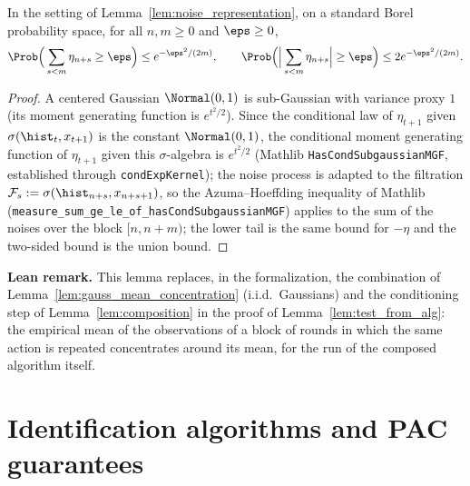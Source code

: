 \begin{lemma}\label{lem:noise_azuma}
\leanok
{}
In the setting of Lemma~\ref{lem:noise_representation}, on a standard Borel probability space,
for all $n, m \ge 0$ and $\eps \ge 0$,
\[
  \Prob\Big(\sum_{s<m}\eta_{n+s} \ge \eps\Big) \le e^{-\eps^2/(2m)},
  \qquad
  \Prob\Big(\Big|\sum_{s<m}\eta_{n+s}\Big| \ge \eps\Big) \le 2e^{-\eps^2/(2m)} .
\]
\end{lemma}

\begin{proof}
\leanok
{}
A centered Gaussian $\Normal(0,1)$ is sub-Gaussian with variance proxy $1$
(its moment generating function is $e^{t^2/2}$). Since the conditional law of $\eta_{t+1}$ given
$\sigma(\hist_t, x_{t+1})$ is the constant $\Normal(0,1)$, the conditional moment generating
function of $\eta_{t+1}$ given this $\sigma$-algebra is $e^{t^2/2}$ (Mathlib
\texttt{HasCondSubgaussianMGF}, established through \texttt{condExpKernel}); the noise
process is adapted to the filtration $\mathcal F_s := \sigma(\hist_{n+s}, x_{n+s+1})$, so the
Azuma--Hoeffding inequality of Mathlib
(\texttt{measure\_sum\_ge\_le\_of\_hasCondSubgaussianMGF}) applies to the sum of the noises
over the block $[n, n+m)$; the lower tail is the same bound for $-\eta$ and the two-sided bound
is the union bound.
\end{proof}

\textbf{Lean remark.} This lemma replaces, in the formalization, the combination of
Lemma~\ref{lem:gauss_mean_concentration} (i.i.d.\ Gaussians) and the conditioning step of
Lemma~\ref{lem:composition} in the proof of Lemma~\ref{lem:test_from_alg}: the empirical mean of
the observations of a block of rounds in which the same action is repeated concentrates around
its mean, for the run of the composed algorithm itself.

\section{Identification algorithms and PAC guarantees}
\label{sec:model_pac}


